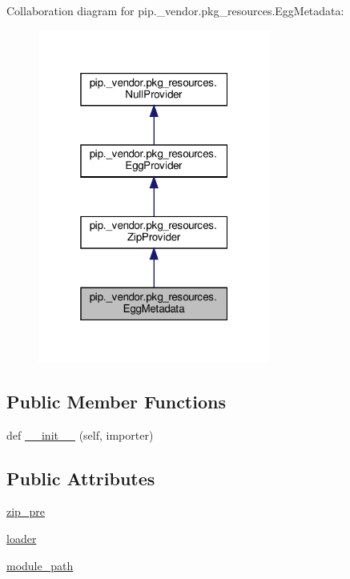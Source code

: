 Collaboration diagram for pip.\+\_\+vendor.\+pkg\+\_\+resources.\+Egg\+Metadata\+:
\nopagebreak
\begin{figure}[H]
\begin{center}
\leavevmode
\includegraphics[width=217pt]{classpip_1_1__vendor_1_1pkg__resources_1_1EggMetadata__coll__graph}
\end{center}
\end{figure}
\subsection*{Public Member Functions}
\begin{DoxyCompactItemize}
\item 
def \hyperlink{classpip_1_1__vendor_1_1pkg__resources_1_1EggMetadata_ad2d01d5e5211352b2fa9659b6031cce6}{\+\_\+\+\_\+init\+\_\+\+\_\+} (self, importer)
\end{DoxyCompactItemize}
\subsection*{Public Attributes}
\begin{DoxyCompactItemize}
\item 
\hyperlink{classpip_1_1__vendor_1_1pkg__resources_1_1EggMetadata_a81638a746af897eecf879afc5205ae82}{zip\+\_\+pre}
\item 
\hyperlink{classpip_1_1__vendor_1_1pkg__resources_1_1EggMetadata_a3fd2e8eb9903a001ac586da5547fc653}{loader}
\item 
\hyperlink{classpip_1_1__vendor_1_1pkg__resources_1_1EggMetadata_a5fb2ee16ac58f7ab75fe11436ca47266}{module\+\_\+path}
\end{DoxyCompactItemize}
